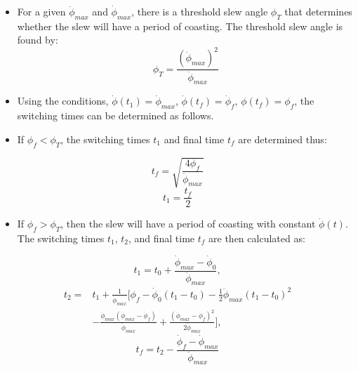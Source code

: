 \documentclass[letterpaper, preprint, paper,11pt]{AAS}	%
\begin{document}
	


\begin{itemize}
	\item For a given $\ddot{\phi}_{max}$ and $\dot{\phi}_{max}$, there is a threshold slew angle $\phi_T$ that determines whether the slew will have a period of coasting. The threshold slew angle is found by: 
		\begin{equation}
		\phi_T = \frac{(\dot{\phi}_{max})^2}{\ddot{\phi}_{max}}
		\end{equation}
	\item Using the conditions, $\dot{\phi}(t_1)=\dot{\phi}_{max}$, $\dot{\phi}(t_f)=\dot{\phi}_f$, $\phi(t_f)=\phi_f$, the switching times can be determined as follows. 
	\item If $\phi_f < \phi_T$, the switching times $t_1$ and final time $t_f$ are determined thus:
\end{itemize}
\begin{equation}
	t_f = \sqrt{\frac{4\phi_f}{\ddot{\phi}_{max}}}
\end{equation} 
\begin{equation}
	t_1 = \frac{t_f}{2}
\end{equation}

\begin{itemize}
	\item If $\phi_f > \phi_T$, then the slew will have a period of coasting with constant $\dot{\phi}(t)$. The switching times $t_1$, $t_2$, and final time $t_f$ are then calculated as: 
\end{itemize}

\begin{equation}\label{t1cons}
	t_1=t_0+\frac{\dot{\phi}_{max}-\dot{\phi}_0}{\ddot{\phi}_{max}},
\end{equation}
\begin{equation}\label{t2cons}
	\begin{split}
	t_2 = & t_1 + \frac{1}{\dot{\phi}_{max}}\Big[ \phi_f-\dot{\phi}_0(t_1-t_0)-\frac{1}{2}\ddot{\phi}_{max}(t_1-t_0)^2 \\
	& -\frac{\dot{\phi}_{max}(\dot{\phi}_{max}-\dot{\phi}_f)}{\ddot{\phi}_{max}}+\frac{(\dot{\phi}_{max}-\dot{\phi}_f)^2}{2\ddot{\phi}_{max}} \Big],
	\end{split}
\end{equation}
\begin{equation}\label{tfcons}
	t_f = t_2 - \frac{\dot{\phi}_f - \dot{\phi}_{max}}{\ddot{\phi}_{max}}
\end{equation}

\end{document}
